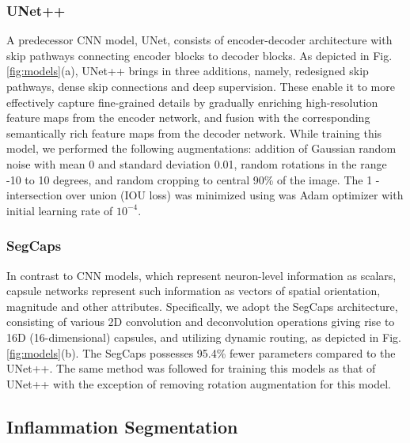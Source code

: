 \subsubsection{UNet++}

A predecessor CNN model, UNet, consists of encoder-decoder architecture with skip pathways connecting encoder blocks to decoder blocks. As depicted in Fig. \ref{fig:models}(a), UNet++ brings in three additions, namely, redesigned skip pathways, dense skip connections and deep supervision. These enable it to more effectively capture fine-grained details by gradually enriching high-resolution feature maps from the encoder network, and fusion with the corresponding semantically rich feature maps from the decoder network. While training this model, we performed the following augmentations: addition of Gaussian random noise with mean 0 and standard deviation 0.01, random rotations in the range -10 to 10 degrees, and random cropping to central 90\% of the image. The 1 - intersection over union (IOU loss) was minimized using was Adam optimizer with initial learning rate of $10^{-4}$.


\subsubsection{SegCaps}

In contrast to CNN models, which represent neuron-level information as scalars, capsule networks represent
such information as vectors of  spatial orientation, magnitude and other attributes. Specifically, we adopt the SegCaps architecture, consisting of various 2D convolution and deconvolution operations giving rise to 16D (16-dimensional) capsules,
and utilizing dynamic routing, as depicted in Fig. \ref{fig:models}(b). The SegCaps possesses 95.4\% fewer parameters compared to the UNet++. The same method was followed for training this models as that of UNet++ with the exception of removing rotation augmentation for this model.




\subsection{Inflammation Segmentation}
\label{sec:Inflammation Segmenation}

